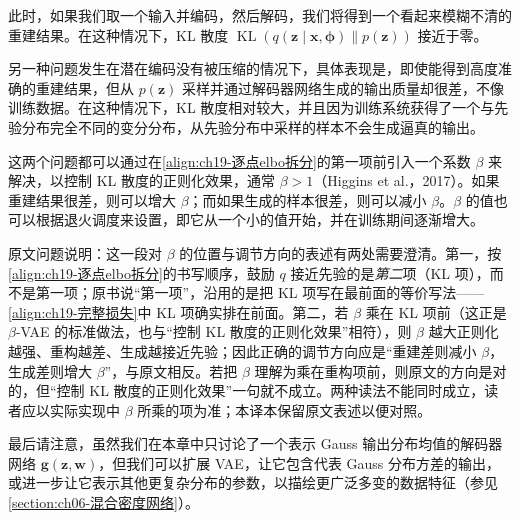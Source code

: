 \documentclass[../../main.tex]{subfiles}
\begin{document}
此时，如果我们取一个输入并编码，然后解码，我们将得到一个看起来模糊不清的重建结果。在这种情况下，KL 散度 $\operatorname{KL}(q(\bm{z}\mid\bm{x},\bm{\phi})\|p(\bm{z}))$ 接近于零。

另一种问题发生在潜在编码没有被压缩的情况下，具体表现是，即使能得到高度准确的重建结果，但从 $p(\bm{z})$ 采样并通过解码器网络生成的输出质量却很差，不像训练数据。在这种情况下，KL 散度相对较大，并且因为训练系统获得了一个与先验分布完全不同的变分分布，从先验分布中采样的样本不会生成逼真的输出。

这两个问题都可以通过在\eqref{align:ch19-逐点elbo拆分}的第一项前引入一个系数 $\beta$ 来解决，以控制 KL 散度的正则化效果，通常 $\beta>1$（Higgins et al.，2017）。如果重建结果很差，则可以增大 $\beta$；而如果生成的样本很差，则可以减小 $\beta$。$\beta$ 的值也可以根据退火调度来设置，即它从一个小的值开始，并在训练期间逐渐增大。

\begin{remark}原文问题说明：这一段对 $\beta$ 的位置与调节方向的表述有两处需要澄清。第一，按\eqref{align:ch19-逐点elbo拆分}的书写顺序，鼓励 $q$ 接近先验的是\emph{第二}项（KL 项），而不是第一项；原书说“第一项”，沿用的是把 KL 项写在最前面的等价写法——\eqref{align:ch19-完整损失}中 KL 项确实排在前面。第二，若 $\beta$ 乘在 KL 项前（这正是 $\beta$-VAE 的标准做法，也与“控制 KL 散度的正则化效果”相符），则 $\beta$ 越大正则化越强、重构越差、生成越接近先验；因此正确的调节方向应是“重建差则减小 $\beta$，生成差则增大 $\beta$”，与原文相反。若把 $\beta$ 理解为乘在重构项前，则原文的方向是对的，但“控制 KL 散度的正则化效果”一句就不成立。两种读法不能同时成立，读者应以实际实现中 $\beta$ 所乘的项为准；本译本保留原文表述以便对照。
\end{remark}

最后请注意，虽然我们在本章中只讨论了一个表示 Gauss 输出分布均值的解码器网络 $\bm{g}(\bm{z},\bm{w})$，但我们可以扩展 VAE，让它包含代表 Gauss 分布方差的输出，或进一步让它表示其他更复杂分布的参数，以描绘更广泛多变的数据特征（参见\cref{section:ch06-混合密度网络}）。
\end{document}
